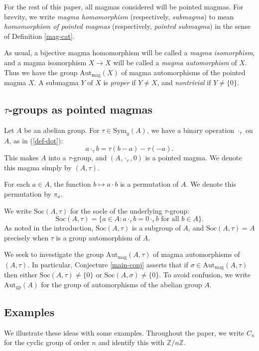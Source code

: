 \documentclass[letterpaper,12pt]{amsart}
\numberwithin{equation}{section}
\numberwithin{algorithm}{section}
\theoremstyle{definition}
\newcommand{\Z}{\mathbb{Z}}
\newcommand{\Soc}{\mathrm{Soc}}
\newcommand{\Autgp}{\mathrm{Aut}_{\mathrm{gp}}}
\newcommand{\Autmag}{\mathrm{Aut}_\mathrm{mag}}
\newcommand{\Symo}{\mathrm{Sym}_0}
\begin{document}
For the rest of this paper, all magmas considered will be pointed magmas. For brevity, we write
{\em magma homomorphism} (respectively, {\em submagma}) to mean {\em homomorphism of pointed magmas} (respectively, {\em pointed submagma}) in the sense of Definition \ref{mag-cat}. 

As usual, a bijective magma homomorphism will be called a {\em magma isomorphism}, and
a magma isomorphism $X \to X$ will be called a {\em magma automorphism} of $X$. Thus
we have the group $\Autmag(X)$ of magma automorphisms of the pointed magma $X$. A submagma $Y$ of $X$ is {\em proper} if $Y \neq X$, and {\em nontrivial} if $Y \neq \{0\}$.
		
\subsection{$\tau$-groups as pointed magmas}
Let $A$ be an abelian group. For $\tau \in \Symo(A)$, we have a binary operation $\cdot_\tau$ on $A$, as in (\ref{def-dot}):
$$ a \cdot_\tau b = \tau(b-a) - \tau(-a).  $$ 
This makes $A$ into a $\tau$-group, and $(A, \cdot_\tau,0)$ is a pointed magma. We denote this magma simply by $(A, \tau)$.

For each $a \in A$, the function $b \mapsto a \cdot b$ is a permutation of $A$. We denote this permutation by $\pi_a$. 

We write $\Soc(A,\tau)$ for the socle of the underlying $\tau$-group:
$$	\Soc(A,\tau) =  \{ a \in A : a \cdot_\tau b = 0 \cdot_\tau b \mbox{ for all } b \in A \}. $$
As noted in the introduction, $\Soc(A,\tau)$ is a subgroup of $A$, and $\Soc(A,\tau)=A$ precisely when $\tau$ is a group automorphism of $A$. 

We seek to investigate the group $\Autmag(A,\tau)$ of magma automorphisms of $(A,\tau)$. In particular, Conjecture \ref{main-conj} asserts that if $\sigma \in \Autmag(A,\tau)$ then either $\Soc(A,\tau) \neq \{0\}$ or $\Soc(A,\sigma) \neq \{0\}$. To avoid confusion, we write $\Autgp(A)$ for the group of  automorphisms of the abelian group $A$. 

\subsection{Examples}

We illustrate these ideas with some examples. Throughout the paper, we write $C_n$ for the cyclic group of order $n$ and identify this with $\Z/n\Z$. 
\end{document}
